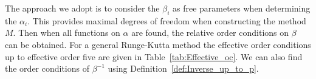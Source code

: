 The approach we adopt is to consider the $\beta_{i}$ as free parameters when determining the $\alpha_i$. This provides maximal degrees of freedom when constructing the method $M$. Then when all functions on $\alpha$ are found, the relative order conditions on $\beta$ can be obtained. For a general Runge-Kutta method the effective order conditions up to effective order five are given in Table~\ref{tab:Effective_oc}. We can also find the order conditions of $\beta^{-1}$ using
Definition~\ref{def:Inverse_up_to_p}.   



